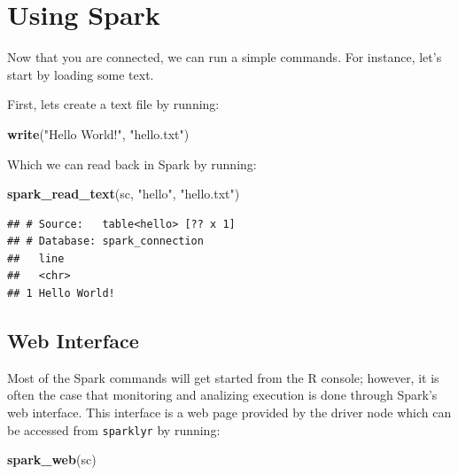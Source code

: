 \documentclass[]{book}
\newenvironment{Shaded}{\begin{snugshade}}{\end{snugshade}}
\newcommand{\KeywordTok}[1]{\textcolor[rgb]{0.13,0.29,0.53}{\textbf{#1}}}
\newcommand{\NormalTok}[1]{#1}
\newcommand{\StringTok}[1]{\textcolor[rgb]{0.31,0.60,0.02}{#1}}
\theoremstyle{definition}
\theoremstyle{definition}
\theoremstyle{definition}
\theoremstyle{remark}
\begin{document}
\hypertarget{using-spark}{%
\section{Using Spark}\label{using-spark}}

Now that you are connected, we can run a simple commands. For instance,
let's start by loading some text.

First, lets create a text file by running:

\begin{Shaded}
\begin{Highlighting}[]
\KeywordTok{write}\NormalTok{(}\StringTok{"Hello World!"}\NormalTok{, }\StringTok{"hello.txt"}\NormalTok{)}
\end{Highlighting}
\end{Shaded}

Which we can read back in Spark by running:

\begin{Shaded}
\begin{Highlighting}[]
\KeywordTok{spark_read_text}\NormalTok{(sc, }\StringTok{"hello"}\NormalTok{, }\StringTok{"hello.txt"}\NormalTok{)}
\end{Highlighting}
\end{Shaded}

\begin{verbatim}
## # Source:   table<hello> [?? x 1]
## # Database: spark_connection
##   line        
##   <chr>       
## 1 Hello World!
\end{verbatim}

\hypertarget{spark-web-interface}{%
\subsection{Web Interface}\label{spark-web-interface}}

Most of the Spark commands will get started from the R console; however,
it is often the case that monitoring and analizing execution is done
through Spark's web interface. This interface is a web page provided by
the driver node which can be accessed from \texttt{sparklyr} by running:

\begin{Shaded}
\begin{Highlighting}[]
\KeywordTok{spark_web}\NormalTok{(sc)}
\end{Highlighting}
\end{Shaded}
\end{document}
